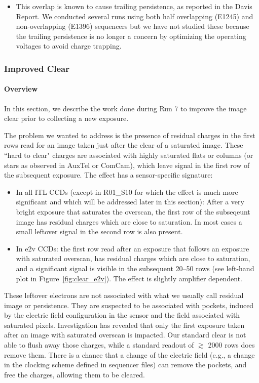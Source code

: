 \begin{itemize}
\begin{itemize}
    \item This overlap is known to cause trailing persistence, as reported in the Davis Report. We conducted several runs using both half overlapping (E1245) and non-overlapping (E1396) sequencers but we have not studied these because the trailing persistence is no longer a concern by optimizing the operating voltages to avoid charge trapping. 
\end{itemize}


\end{itemize}

\subsubsection{Improved Clear}\label{sec:improved-clear}

\paragraph{Overview}\label{overview}

In this section, we describe the work done during Run 7 to improve
the image clear prior to collecting a new exposure.

The problem we wanted to address is the presence of residual charges in
the first rows read for an image taken just after the clear of a saturated
image. These ``hard to clear" charges are associated with highly
saturated flats or columns (or stars as observed in AuxTel or ComCam),
which leave signal in the first row of the subsequent exposure. The effect has a sensor-specific signature:

\begin{itemize}
\item
  In all ITL CCDs (except in R01\_S10 for which
  the effect is much more significant and which will be addressed later
  in this section): After a very bright exposure that saturates the overscan, the first row of the subseqeunt image has residual charges which are close to saturation. In most cases a small leftover signal in the second row is also present.
\item
  In e2v CCDs: the first row read after an exposure that follows an exposure with saturated
  overscan, has residual charges which are close to saturation, and a significant signal is visible
  in the subsequent 20--50 rows (see left-hand plot in Figure~\ref{fig:clear_e2v}).
  The effect is slightly amplifier dependent.
\end{itemize}

These leftover electrons are not associated with what we usually call residual image or persistence. They are suspected to be associated with pockets, induced by the electric field configuration in the sensor and the field associated with saturated pixels.
Investigation has revealed that only the first exposure taken after an image with saturated overscan is impacted. Our standard clear is not able to flush away those charges, while a standard readout of $\gtrsim$ 2000 rows does remove them.
There is a chance that a change of the electric field (e.g., a change in the clocking scheme defined in sequencer files) can remove the pockets, and free the charges, allowing them to be cleared.


